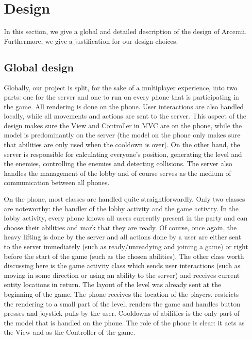 \documentclass[../main.tex]{subfiles}
\begin{document}
\pagebreak

\section{Design}
In this section, we give a global and detailed description of the design of Arcemii. Furthermore, we give a justification for our design choices.

	\subsection{Global design}
	Globally, our project is split, for the sake of a multiplayer experience, into two parts: one for the server and one to run on every phone that is participating in the game. All rendering is done on the phone. User interactions are also handled locally, while all movements and actions are sent to the server. This aspect of the design makes sure the View and Controller in MVC are on the phone, while the model is predominantly on the server (the model on the phone only makes sure that abilities are only used when the cooldown is over). On the other hand, the server is responsible for calculating everyone's position, generating the level and the enemies, controlling the enemies and detecting collisions. The server also handles the management of the lobby and of course serves as the medium of communication between all phones.
	
		On the phone, most classes are handled quite straightforwardly. Only two classes are noteworthy: the handler of the lobby activity and the game activity. In the lobby activity, every phone knows all users currently present in the party and can choose their abilities and mark that they are ready. Of course, once again, the heavy lifting is done by the server and all actions done by a user are either sent to the server immediately (such as ready/unreadying and joining a game) or right before the start of the game (such as the chosen abilities). The other class worth discussing here is the game activity class which sends user interactions (such as moving in some direction or using an ability to the server) and receives current entity locations in return. The layout of the level was already sent at the beginning of the game. The phone receives the location of the players, restricts the rendering to a small part of the level, renders the game and handles button presses and joystick pulls by the user. Cooldowns of abilities is the only part of the model that is handled on the phone. The role of the phone is clear: it acts as the View and as the Controller of the game. 
		
\end{document}
